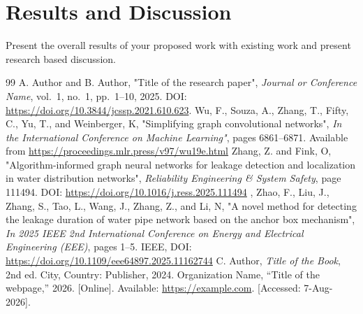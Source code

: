 \documentclass{ssnreview}
\begin{document}
\chapter{Results and Discussion}
Present the overall results of your proposed work with existing work and present research based discussion. 


\begin{thebibliography}{99}
 A. Author and B. Author, "Title of the research paper", \textit{Journal or Conference Name}, vol.~1, no.~1, pp.~1--10, 2025.
DOI: \url{https://doi.org/10.3844/jcssp.2021.610.623}.
 Wu, F., Souza, A., Zhang, T., Fifty, C., Yu, T., and Weinberger, K, "Simplifying graph convolutional networks", \textit{In the International Conference on Machine Learning"}, pages 6861–6871. Available from \url{https://proceedings.mlr.press/v97/wu19e.html}
 Zhang, Z. and Fink, O, "Algorithm-informed graph neural networks for leakage detection and localization in water distribution networks", \textit{Reliability Engineering \& System Safety}, page 111494. DOI: \url{https://doi.org/10.1016/j.ress.2025.111494}
, Zhao, F., Liu, J., Zhang, S., Tao, L., Wang, J., Zhang, Z., and Li, N, "A novel method for detecting the leakage duration of water pipe network based on the anchor box mechanism", \textit{In 2025 IEEE 2nd International Conference on Energy and Electrical Engineering (EEE)}, pages 1–5. IEEE, DOI: \url{https://doi.org/10.1109/eee64897.2025.11162744}
 C. Author, \textit{Title of the Book}, 2nd ed. City, Country: Publisher, 2024.
 Organization Name, ``Title of the webpage,'' 2026. [Online]. Available: \url{https://example.com}. [Accessed: 7-Aug-2026].
\end{thebibliography}
\end{document}

